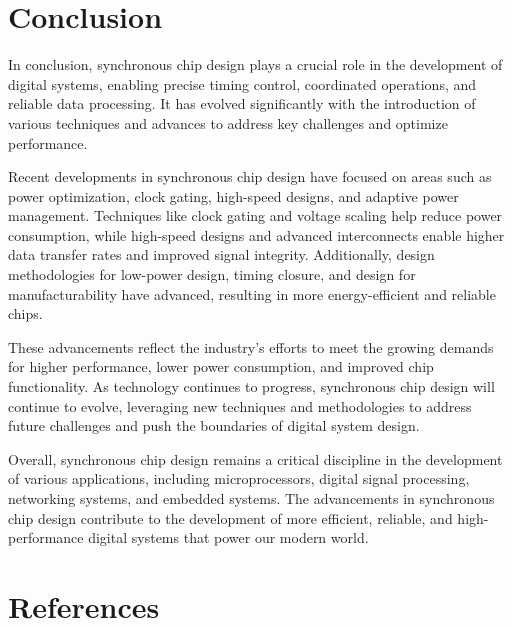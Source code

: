 \documentclass[a4paper,11pt]{report}
\begin{document}
\chapter{Conclusion}
In conclusion, synchronous chip design plays a crucial role in the development of digital systems, enabling precise timing control, coordinated operations, and reliable data processing. It has evolved significantly with the introduction of various techniques and advances to address key challenges and optimize performance.

Recent developments in synchronous chip design have focused on areas such as power optimization, clock gating, high-speed designs, and adaptive power management. Techniques like clock gating and voltage scaling help reduce power consumption, while high-speed designs and advanced interconnects enable higher data transfer rates and improved signal integrity. Additionally, design methodologies for low-power design, timing closure, and design for manufacturability have advanced, resulting in more energy-efficient and reliable chips.

These advancements reflect the industry's efforts to meet the growing demands for higher performance, lower power consumption, and improved chip functionality. As technology continues to progress, synchronous chip design will continue to evolve, leveraging new techniques and methodologies to address future challenges and push the boundaries of digital system design.

Overall, synchronous chip design remains a critical discipline in the development of various applications, including microprocessors, digital signal processing, networking systems, and embedded systems. The advancements in synchronous chip design contribute to the development of more efficient, reliable, and high-performance digital systems that power our modern world.

\chapter{References}
\end{document}
